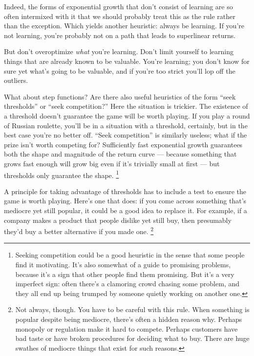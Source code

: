 \documentclass[12pt]{book}
\begin{document}
Indeed, the forms of exponential growth that don't consist of learning
are so often intermixed with it that we should probably treat this as
the rule rather than the exception. Which yields another heuristic:
always be learning. If you're not learning, you're probably not on a
path that leads to superlinear returns.

But don't overoptimize \emph{what} you're learning. Don't limit yourself
to learning things that are already known to be valuable. You're
learning; you don't know for sure yet what's going to be valuable, and
if you're too strict you'll lop off the outliers.

What about step functions? Are there also useful heuristics of the form
``seek thresholds'' or ``seek competition?'' Here the situation is
trickier. The existence of a threshold doesn't guarantee the game will
be worth playing. If you play a round of Russian roulette, you'll be in
a situation with a threshold, certainly, but in the best case you're no
better off. ``Seek competition'' is similarly useless; what if the prize
isn't worth competing for? Sufficiently fast exponential growth
guarantees both the shape and magnitude of the return curve --- because
something that grows fast enough will grow big even if it's trivially
small at first --- but thresholds only guarantee the shape.
\footnote{Seeking competition could be a good heuristic in the sense that
some people find it motivating. It's also somewhat of a guide to
promising problems, because it's a sign that other people find them
promising. But it's a very imperfect sign: often there's a clamoring
crowd chasing some problem, and they all end up being trumped by someone
quietly working on another one.}

A principle for taking advantage of thresholds has to include a test to
ensure the game is worth playing. Here's one that does: if you come
across something that's mediocre yet still popular, it could be a good
idea to replace it. For example, if a company makes a product that
people dislike yet still buy, then presumably they'd buy a better
alternative if you made one. \footnote{Not always, though. You have to be careful with this rule. When
something is popular despite being mediocre, there's often a hidden
reason why. Perhaps monopoly or regulation make it hard to compete.
Perhaps customers have bad taste or have broken procedures for deciding
what to buy. There are huge swathes of mediocre things that exist for
such reasons.}
\end{document}
